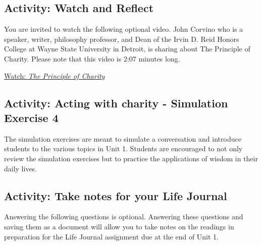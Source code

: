 \documentclass[
]{book}
\begin{document}
\hypertarget{activity-watch-and-reflect-4}{%
\subsection*{Activity: Watch and Reflect}\label{activity-watch-and-reflect-4}}

\begin{reflect}
You are invited to watch the following optional video. John Corvino who is a speaker, writer, philosophy professor, and Dean of the Irvin D. Reid Honors College at Wayne State University in Detroit, is sharing about The Principle of Charity. Please note that this video is 2:07 minutes long.

\href{https://www.youtube.com/watch?v=LZZ7tQnI2-M}{Watch: \emph{The Principle of Charity}}
\end{reflect}

\hypertarget{activity-acting-with-charity---simulation-exercise-4}{%
\subsection*{Activity: Acting with charity - Simulation Exercise 4}\label{activity-acting-with-charity---simulation-exercise-4}}

\begin{reflect}
The simulation exercises are meant to simulate a conversation and introduce students to the various topics in Unit 1. Students are encouraged to not only review the simulation exercises but to practice the applications of wisdom in their daily lives.
\end{reflect}

\hypertarget{activity-take-notes-for-your-life-journal-4}{%
\subsection*{Activity: Take notes for your Life Journal}\label{activity-take-notes-for-your-life-journal-4}}

\begin{reflect}
Answering the following questions is optional. Answering these questions and saving them as a document will allow you to take notes on the readings in preparation for the Life Journal assignment due at the end of Unit 1.
\end{reflect}
\end{document}
